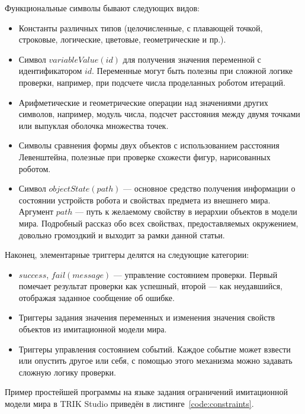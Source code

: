 \documentclass[conference]{IEEEtran}
\begin{document}
Функциональные символы бывают следующих видов:
\begin{itemize}
	\item Константы различных типов (целочисленные, с плавающей точкой, строковые, логические, цветовые, геометрические и пр.).
	\item Символ $variableValue(id)$ для получения значения переменной с идентификатором $id$. Переменные 
			могут быть полезны при сложной логике проверки, например, при подсчете числа проделанных роботом итераций.
	\item Арифметические и геометрические операции над значениями других символов, например, модуль числа, 
			подсчет расстояния между двумя точками или выпуклая оболочка множества точек.
	\item Символы сравнения формы двух объектов с использованием расстояния Левенштейна, полезные при 
			проверке схожести фигур, нарисованных роботом.
	\item Символ $objectState(path)$ --- основное средство получения информации о состоянии устройств 
			робота и свойствах предмета из внешнего мира. Аргумент $path$ --- путь к желаемому свойству 
			в иерархии объектов в модели мира. Подробный рассказ обо всех свойствах, предоставляемых окружением, 
			довольно громоздкий и выходит за рамки данной статьи.
\end{itemize}

Наконец, элементарные триггеры делятся на следующие категории:
\begin{itemize}
	\item $success$, $fail(message)$ --- управление состоянием проверки. Первый помечает результат проверки 
			как успешный, второй --- как неудавшийся, отображая заданное сообщение об ошибке.
	\item Триггеры задания значения переменных и изменения значения свойств объектов из имитационной модели мира.
	\item Триггеры управления состоянием событий. Каждое событие может взвести или опустить другое или себя, 
			с помощью этого механизма можно задавать сложную логику проверки.
\end{itemize}

Пример простейшей программы на языке задания ограничений имитационной модели мира в TRIK Studio приведён в листинге~\ref{code:constraints}.

\captionsetup[figure]{name=Листинг}
\setcounter{figure}{0}
\end{document}
